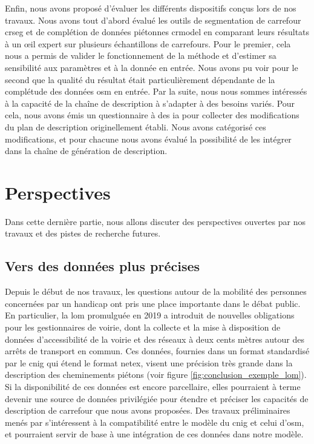 Enfin, nous avons proposé d'évaluer les différents dispositifs conçus lors de nos travaux. Nous avons tout d'abord évalué les outils de segmentation de carrefour crseg et de complétion de données piétonnes crmodel en comparant leurs résultats à un œil expert sur plusieurs échantillons de carrefours. Pour le premier, cela nous a permis de valider le fonctionnement de la méthode et d'estimer sa sensibilité aux paramètres et à la donnée en entrée. Nous avons pu voir pour le second que la qualité du résultat était particulièrement dépendante de la complétude des données \gls{osm} en entrée. Par la suite, nous nous sommes intéressés à la capacité de la chaîne de description à s'adapter à des besoins variés. Pour cela, nous avons émis un questionnaire à des \gls{ia} pour collecter des modifications du plan de description originellement établi. Nous avons catégorisé ces modifications, et pour chacune nous avons évalué la possibilité de les intégrer dans la chaîne de génération de description.

\section{Perspectives}

Dans cette dernière partie, nous allons discuter des perspectives ouvertes par nos travaux et des pistes de recherche futures.

\subsection{Vers des données plus précises}

Depuis le début de nos travaux, les questions autour de la mobilité des personnes concernées par un handicap ont pris une place importante dans le débat public. En particulier, la \gls{lom} promulguée en 2019 a introduit de nouvelles obligations pour les gestionnaires de voirie, dont la collecte et la mise à disposition de données d'accessibilité de la voirie et des réseaux à deux cents mètres autour des arrêts de transport en commun. Ces données, fournies dans un format standardisé par le \gls{cnig} \citep{geostandard2021} qui étend le format \gls{netex}, visent une précision très grande dans la description des cheminements piétons (voir figure \ref{fig:conclusion_exemple_lom}). Si la disponibilité de ces données est encore parcellaire, elles pourraient à terme devenir une source de données privilégiée pour étendre et préciser les capacités de description de carrefour que nous avons proposées. Des travaux préliminaires menés par \citet{WadjomKammegne2021} s'intéressent à la compatibilité entre le modèle du \gls{cnig} et celui d'\gls{osm}, et pourraient servir de base à une intégration de ces données dans notre modèle.

